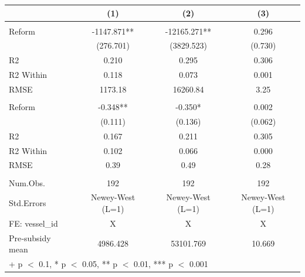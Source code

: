 \begin{table}
\centering
\begin{tabular}[t]{lccc}
\toprule
  & (1) & (2) & (3)\\
\midrule
\addlinespace[0.5em]
\multicolumn{4}{l}{\textit{Panel A}}\\
\midrule \hspace{1em}Reform & -1147.871** & -12165.271** & 0.296\\
\hspace{1em} & (276.701) & (3829.523) & (0.730)\\
\hspace{1em}R2 & 0.210 & 0.295 & 0.306\\
\hspace{1em}R2 Within & 0.118 & 0.073 & 0.001\\
\hspace{1em}RMSE & 1173.18 & 16260.84 & 3.25\\
\addlinespace[0.5em]
\multicolumn{4}{l}{\textit{Panel B}}\\
\midrule \hspace{1em}Reform & -0.348** & -0.350* & 0.002\\
\hspace{1em} & (0.111) & (0.136) & (0.062)\\
\hspace{1em}R2 & 0.167 & 0.211 & 0.305\\
\hspace{1em}R2 Within & 0.102 & 0.066 & 0.000\\
\hspace{1em}RMSE & 0.39 & 0.49 & 0.28\\
\midrule\\
\hspace{1em}Num.Obs. & 192 & 192 & 192\\
\hspace{1em}Std.Errors & Newey-West (L=1) & Newey-West (L=1) & Newey-West (L=1)\\
\hspace{1em}FE: vessel_id & X & X & X\\
Pre‑subsidy mean & 4986.428 & 53101.769 & 10.669\\
\bottomrule
\multicolumn{4}{l}{\rule{0pt}{1em}+ p $<$ 0.1, * p $<$ 0.05, ** p $<$ 0.01, *** p $<$ 0.001}\\
\end{tabular}
\end{table}
